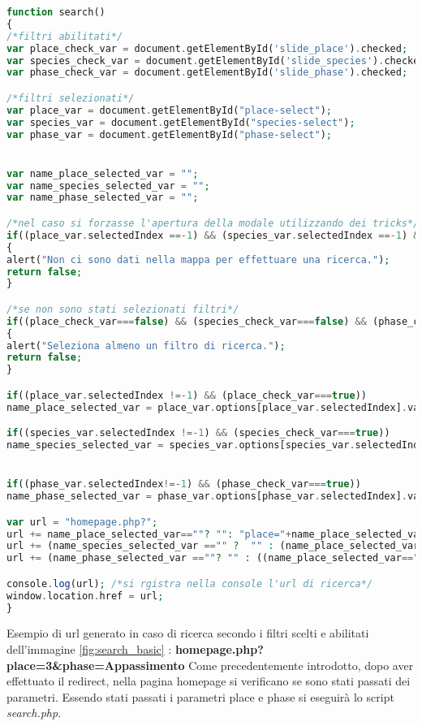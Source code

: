 \begin{lstlisting}[language=PHP]
function search()
{
/*filtri abilitati*/
var place_check_var = document.getElementById('slide_place').checked;
var species_check_var = document.getElementById('slide_species').checked;
var phase_check_var = document.getElementById('slide_phase').checked;

/*filtri selezionati*/
var place_var = document.getElementById("place-select");
var species_var = document.getElementById("species-select");
var phase_var = document.getElementById("phase-select");


var name_place_selected_var = "";
var name_species_selected_var = "";
var name_phase_selected_var = "";

/*nel caso si forzasse l'apertura della modale utilizzando dei tricks*/
if((place_var.selectedIndex ==-1) && (species_var.selectedIndex ==-1) && (phase_var.selectedIndex==-1))
{
alert("Non ci sono dati nella mappa per effettuare una ricerca.");
return false;
}

/*se non sono stati selezionati filtri*/
if((place_check_var===false) && (species_check_var===false) && (phase_check_var===false))
{
alert("Seleziona almeno un filtro di ricerca.");
return false;
}

if((place_var.selectedIndex !=-1) && (place_check_var===true))
name_place_selected_var = place_var.options[place_var.selectedIndex].value;

if((species_var.selectedIndex !=-1) && (species_check_var===true))
name_species_selected_var = species_var.options[species_var.selectedIndex].value;


if((phase_var.selectedIndex!=-1) && (phase_check_var===true))
name_phase_selected_var = phase_var.options[phase_var.selectedIndex].value;

var url = "homepage.php?";
url += name_place_selected_var==""? "": "place="+name_place_selected_var;
url += (name_species_selected_var =="" ?  "" : (name_place_selected_var==""? "species="+name_species_selected_var : "&species="+name_species_selected_var));
url += (name_phase_selected_var ==""? "" : ((name_place_selected_var=="" && name_species_selected_var =="")? "phase="+name_phase_selected_var : "&phase="+name_phase_selected_var));

console.log(url); /*si rgistra nella console l'url di ricerca*/
window.location.href = url;
}
\end{lstlisting}
Esempio di url generato in caso di ricerca secondo i filtri scelti e abilitati dell'immagine \ref{fig:search_basic} : \newline
\newline \textbf{homepage.php?place=3\&phase=Appassimento} \newline \newline
Come precedentemente introdotto, dopo aver effettuato il redirect, nella pagina homepage si verificano se sono stati passati dei parametri. Essendo stati passati i parametri place e phase si eseguirà lo script \textit{search.php}.

